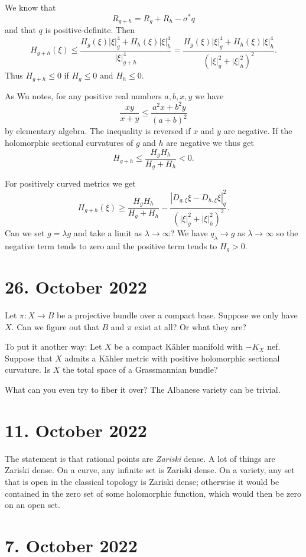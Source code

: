 \documentclass[11pt]{amsart}
\theoremstyle{definition}
\begin{document}
We know that
\[
R_{g + h} = R_g + R_h - \sigma^* q
\]
and that $q$ is positive-definite.
Then
\[
H_{g+h}(\xi)
\leq \frac{H_g(\xi) |\xi|^4_g + H_h(\xi) |\xi|^4_h}{|\xi|^4_{g + h}}
= \frac{H_g(\xi) |\xi|^4_g + H_h(\xi) |\xi|^4_h}{(|\xi|^2_{g} + |\xi|^2_h)^2}.
\]
Thus $H_{g + h} \leq 0$ if $H_g \leq 0$ and $H_h \leq 0$.

As Wu notes,
for any positive real numbers $a, b, x, y$ we have
\[
\frac{xy}{x + y} \leq \frac{a^2 x + b^2 y}{(a + b)^2}
\]
by elementary algebra.
The inequality is reversed if $x$ and $y$ are negative.
If the holomorphic sectional curvatures of $g$ and $h$ are negative we thus get
\[
H_{g + h} \leq \frac{H_g H_h}{H_g + H_h} < 0.
\]

For positively curved metrics we get
\[
H_{g + h}(\xi)
\geq \frac{H_g H_h}{H_g + H_h}
- \frac{|D_{g,\xi}\xi - D_{h,\xi}\xi|^2_q}
{(|\xi|_g^2 + |\xi|_h^2)^2}.
\]
Can we set $g = \lambda g$ and take a limit as $\lambda \to \infty$? We have
$q_\lambda \to g$ as $\lambda \to \infty$ so the negative term tends to zero and the positive term tends to $H_g > 0$.

\section{26. October 2022}

Let $\pi : X \to B$ be a projective bundle over a compact base.
Suppose we only have $X$.
Can we figure out that $B$ and $\pi$ exist at all?
Or what they are?

To put it another way:
Let $X$ be a compact K\"ahler manifold with $-K_X$ nef.
Suppose that $X$ admits a K\"ahler metric with positive holomorphic sectional
curvature.
Is $X$ the total space of a Grassmannian bundle?

What can you even try to fiber it over?
The Albanese variety can be trivial.




\section{11. October 2022}

The statement is that rational points are \emph{Zariski} dense.
A lot of things are Zariski dense.
On a curve, any infinite set is Zariski dense.
On a variety, any set that is open in the classical topology is Zariski dense;
otherwise it would be contained in the zero set of some holomorphic function,
which would then be zero on an open set.


\section{7. October 2022}
\end{document}

